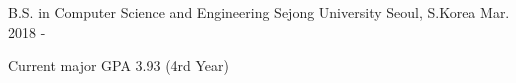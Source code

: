 

\begin{cventries}

  \cventry
    {B.S. in Computer Science and Engineering} %
    {Sejong University} %
    {Seoul, S.Korea} %
    {Mar. 2018 - } %
    {
      \begin{cvitems} %
        \item {Current major GPA 3.93 (4rd Year)}
      \end{cvitems}
    }

\end{cventries}
